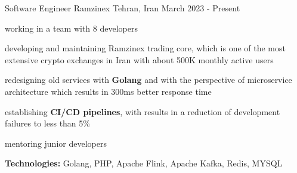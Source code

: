 

\begin{cventries}

  \cventry
    {Software Engineer} %
    {Ramzinex} %
    {Tehran, Iran} %
    {March 2023 - Present} %
    {
      \begin{cvitems} %
        \item working in a team with 8 developers
        \item developing and maintaining Ramzinex trading core, which is one of the most extensive crypto exchanges in Iran with about 500K monthly active users
        \item redesigning old services with \textbf{Golang} and with the perspective of microservice architecture which results in 300ms better response time
        \item establishing \textbf{CI/CD pipelines}, with results in a reduction of development failures to less than 5\%
        \item mentoring junior developers
        \item \textbf{Technologies:} Golang, PHP, Apache Flink, Apache Kafka, Redis, MYSQL
      \end{cvitems}
    }


\end{cventries}
